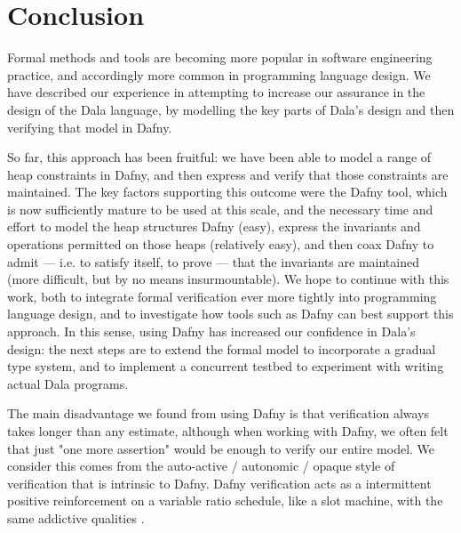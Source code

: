 \section{Conclusion}



\vspace*{1mm}

Formal methods and tools are becoming more popular in software engineering practice, and accordingly more common in programming language design.  We have
described our experience in attempting to increase our assurance in the design of the Dala language,
by modelling the key parts of Dala's design and then verifying that model in Dafny. 

So far, this approach has been fruitful:  we have been able to model a range of heap constraints in Dafny, and then express and verify that those constraints are maintained. 
%
The key factors supporting this outcome were the Dafny tool, which is
now sufficiently mature to be used at this scale, and the necessary
time and effort to model the heap structures Dafny (easy), express the invariants and operations permitted on those heaps (relatively easy), and then coax Dafny to admit --- i.e. to satisfy itself, to prove --- that the invariants are maintained (more difficult, but by no means insurmountable).  We hope to continue with this work,
both to integrate formal verification ever more tightly into programming language design, and to investigate how tools such as Dafny can best support this approach.
%
In this sense, using Dafny has increased our confidence in Dala's design: the next steps are to extend the formal model to incorporate a gradual type system, and to 
implement a concurrent testbed to experiment with writing actual Dala programs.

The main disadvantage we found from using Dafny is that verification always takes longer than any estimate, although when working with Dafny, we often felt that just "one more assertion" would be enough to verify our entire model. We consider this comes from the auto-active / autonomic / opaque style of verification that is intrinsic to Dafny. Dafny verification acts as a intermittent positive reinforcement on a variable ratio schedule, like a slot machine, with the same addictive qualities
\cite{dafny-europlop2024}.

